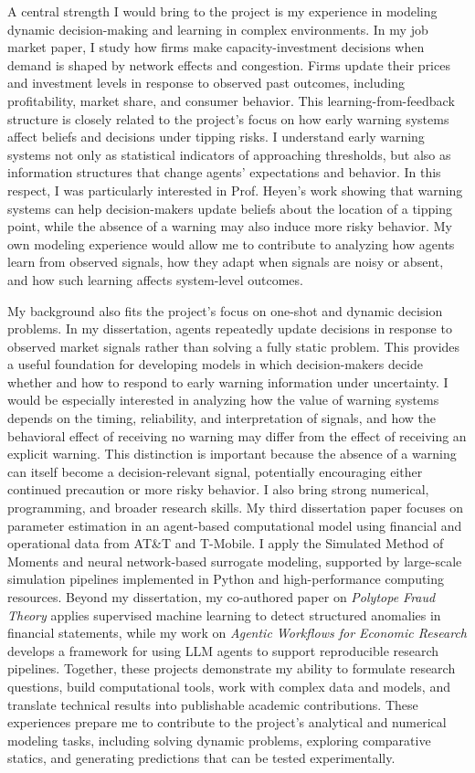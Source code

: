 \documentclass[11pt]{article}
\begin{document}
A central strength I would bring to the project is my experience in modeling dynamic decision-making and learning in complex environments. In my job market paper, I study how firms make capacity-investment decisions when demand is shaped by network effects and congestion. Firms update their prices and investment levels in response to observed past outcomes, including profitability, market share, and consumer behavior. This learning-from-feedback structure is closely related to the project's focus on how early warning systems affect beliefs and decisions under tipping risks. I understand early warning systems not only as statistical indicators of approaching thresholds, but also as information structures that change agents' expectations and behavior. In this respect, I was particularly interested in Prof. Heyen's work showing that warning systems can help decision-makers update beliefs about the location of a tipping point, while the absence of a warning may also induce more risky behavior. My own modeling experience would allow me to contribute to analyzing how agents learn from observed signals, how they adapt when signals are noisy or absent, and how such learning affects system-level outcomes.

My background also fits the project's focus on one-shot and dynamic decision problems. In my dissertation, agents repeatedly update decisions in response to observed market signals rather than solving a fully static problem. This provides a useful foundation for developing models in which decision-makers decide whether and how to respond to early warning information under uncertainty. I would be especially interested in analyzing how the value of warning systems depends on the timing, reliability, and interpretation of signals, and how the behavioral effect of receiving no warning may differ from the effect of receiving an explicit warning. This distinction is important because the absence of a warning can itself become a decision-relevant signal, potentially encouraging either continued precaution or more risky behavior. 
I also bring strong numerical, programming, and broader research skills. My third dissertation paper focuses on parameter estimation in an agent-based computational model using financial and operational data from AT\&T and T-Mobile. I apply the Simulated Method of Moments and neural network-based surrogate modeling, supported by large-scale simulation pipelines implemented in Python and high-performance computing resources. Beyond my dissertation, my co-authored paper on \emph{Polytope Fraud Theory} applies supervised machine learning to detect structured anomalies in financial statements, while my work on \emph{Agentic Workflows for Economic Research} develops a framework for using LLM agents to support reproducible research pipelines. Together, these projects demonstrate my ability to formulate research questions, build computational tools, work with complex data and models, and translate technical results into publishable academic contributions. These experiences prepare me to contribute to the project's analytical and numerical modeling tasks, including solving dynamic problems, exploring comparative statics, and generating predictions that can be tested experimentally.
\end{document}
